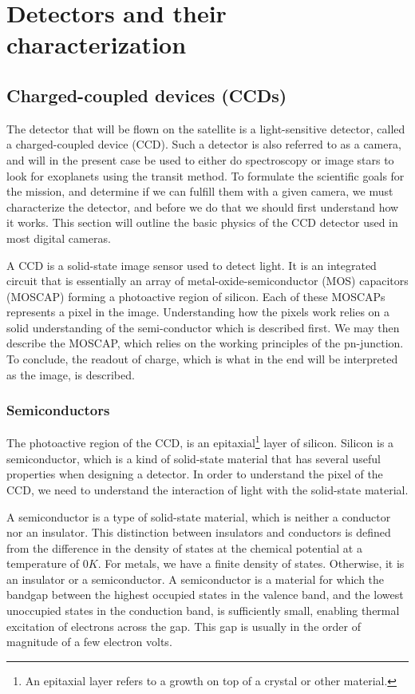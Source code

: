 \documentclass[../main.tex]{subfiles}
\begin{document}
	
	\chapter{Detectors and their characterization}
	\section{Charged-coupled devices (CCDs)}
	The detector that will be flown on the satellite is a light-sensitive detector, called a charged-coupled device (CCD). Such a detector is also referred to as a camera, and will in the present case be used to either do spectroscopy or image stars to look for exoplanets using the transit method. To formulate the scientific goals for the mission, and determine if we can fulfill them with a given camera, we must characterize the detector, and before we do that we should first understand how it works. This section will outline the basic physics of the CCD detector used in most digital cameras. 
	
	A CCD is a solid-state image sensor used to detect light. It is an integrated circuit that is essentially an array of metal-oxide-semiconductor (MOS) capacitors (MOSCAP) forming a photoactive region of silicon. Each of these MOSCAPs represents a pixel in the image. Understanding how the pixels work relies on a solid understanding of the semi-conductor which is described first. We may then describe the MOSCAP, which relies on the working principles of the pn-junction. To conclude, the readout of charge, which is what in the end will be interpreted as the image, is described.
	
	\subsection{Semiconductors}
	The photoactive region of the CCD, is an epitaxial\footnote{An epitaxial layer refers to a growth on top of a crystal or other material.} layer of silicon. Silicon is a semiconductor, which is a kind of solid-state material that has several useful properties when designing a detector. In order to understand the pixel of the CCD, we need to understand the interaction of light with the solid-state material. 
	
	A semiconductor is a type of solid-state material, which is neither a conductor nor an insulator. This distinction between insulators and conductors is defined from the difference in the density of states at the chemical potential at a temperature of $0K$\cite{solidstatephysicsbook}. For metals, we have a finite density of states. Otherwise, it is an insulator or a semiconductor. A semiconductor is a material for which the bandgap between the highest occupied states in the valence band, and the lowest unoccupied states in the conduction band, is sufficiently small, enabling thermal excitation of electrons across the gap. This gap is usually in the order of magnitude of a few electron volts. 
	
\end{document}
